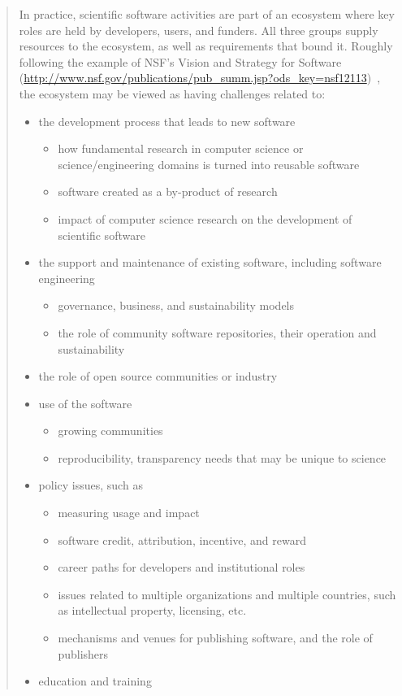 \documentclass[11pt, oneside]{amsart}
\begin{document}
\begin{quote}
In practice, scientific software activities are part of an ecosystem where key roles are held by developers, users, and funders.  All three groups supply resources to the ecosystem, as well as requirements that bound it.  Roughly following the example of NSF's Vision and Strategy for Software (\url{http://www.nsf.gov/publications/pub_summ.jsp?ods_key=nsf12113})~\cite{NSF_software_vision}, the ecosystem may be viewed as having challenges related to:

\begin{itemize}
\item the development process that leads to new software
\begin{itemize}
\item how fundamental research in computer science or science/engineering domains is turned  into reusable software
\item software created as a by-product of research
\item impact of computer science research on the development of scientific software
\end{itemize}
\item the support and maintenance of existing software, including software engineering
\begin{itemize}
\item governance, business, and sustainability models
\item the role of community software repositories, their operation and sustainability
\end{itemize}
\item the role of open source communities or industry
\item use of the software
\begin{itemize}
\item growing communities
\item reproducibility, transparency needs that may be unique to science
\end{itemize}
\item policy issues, such as
\begin{itemize}
\item measuring usage and impact
\item software credit, attribution, incentive, and reward
\item career paths for developers and institutional roles
\item issues related to multiple organizations and multiple countries, such as intellectual property, licensing, etc.
\item mechanisms and venues for publishing software, and the role of publishers
\end{itemize}
\item education and training
\end{itemize}

\end{quote}
\end{document}
